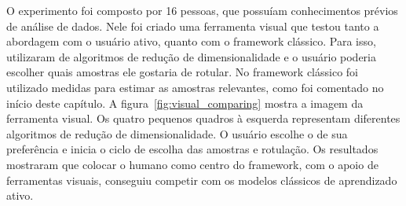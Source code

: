 O experimento foi composto por 16 pessoas, que possuíam conhecimentos prévios de análise de dados. Nele foi criado uma ferramenta visual que testou tanto a abordagem com o usuário ativo, quanto com o framework clássico. Para isso, utilizaram de algoritmos de redução de dimensionalidade e o usuário poderia escolher quais amostras ele gostaria de rotular. No framework clássico foi utilizado medidas para estimar as amostras relevantes, como foi comentado no início deste capítulo. A figura~\ref{fig:visual_comparing} mostra a imagem da ferramenta visual. Os quatro pequenos quadros à esquerda representam diferentes algoritmos de redução de dimensionalidade. O usuário escolhe o de sua preferência e inicia o ciclo de escolha das amostras e rotulação. Os resultados mostraram que colocar o humano como centro do framework, com o apoio de ferramentas visuais, conseguiu competir com os modelos clássicos de aprendizado ativo. 










